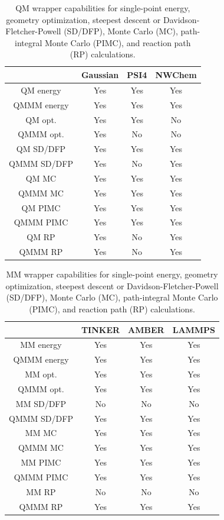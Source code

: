 \documentclass[12pt]{report}
\begin{document}
\begin{table}[hbt]
 \centering
 \begin{tabular}{|c|c c c|}
 \hline
  & Gaussian & PSI4 & NWChem \\ \hline
 QM energy & Yes & Yes & Yes \\
 QMMM energy & Yes & Yes & Yes \\ \hline
 QM opt. & Yes & Yes & No \\
 QMMM opt. & Yes & No & No \\ \hline
 QM SD/DFP & Yes & Yes & Yes \\
 QMMM SD/DFP & Yes & No & Yes \\ \hline
 QM MC & Yes & Yes & Yes \\
 QMMM MC & Yes & Yes & Yes\\ \hline
 QM PIMC & Yes & Yes & Yes \\
 QMMM PIMC & Yes & Yes & Yes \\ \hline
 QM RP & Yes & No & Yes\\
 QMMM RP & Yes & No & Yes \\ \hline
 \end{tabular}
 \caption{QM wrapper capabilities for single-point energy, geometry
 optimization, steepest descent or Davidson-Fletcher-Powell (SD/DFP),
 Monte Carlo (MC), path-integral Monte Carlo (PIMC), and reaction path (RP)
 calculations.}
 \label{tab:QMWrapCap}
\end{table}

\begin{table}[hbt]
 \centering
 \begin{tabular}{|c|c c c|}
 \hline
  & TINKER & AMBER & LAMMPS \\ \hline
 MM energy &  Yes & Yes & Yes \\
 QMMM energy & Yes & Yes & Yes \\ \hline
 MM opt. & Yes & Yes & Yes \\
 QMMM opt. & Yes & Yes & Yes \\ \hline
 MM SD/DFP & No & No & No \\
 QMMM SD/DFP & Yes & Yes & Yes \\ \hline
 MM MC & Yes & Yes & Yes \\
 QMMM MC & Yes & Yes & Yes \\ \hline
 MM PIMC & Yes & Yes & Yes \\
 QMMM PIMC & Yes & Yes & Yes \\ \hline
 MM RP & No & No & No \\
 QMMM RP & Yes & Yes & Yes \\ \hline
 \end{tabular}
 \caption{MM wrapper capabilities for single-point energy, geometry
 optimization, steepest descent or Davidson-Fletcher-Powell (SD/DFP),
 Monte Carlo (MC), path-integral Monte Carlo (PIMC), and reaction path (RP)
 calculations.}
 \label{tab:MMWrapCap}
\end{table}
\end{document}
